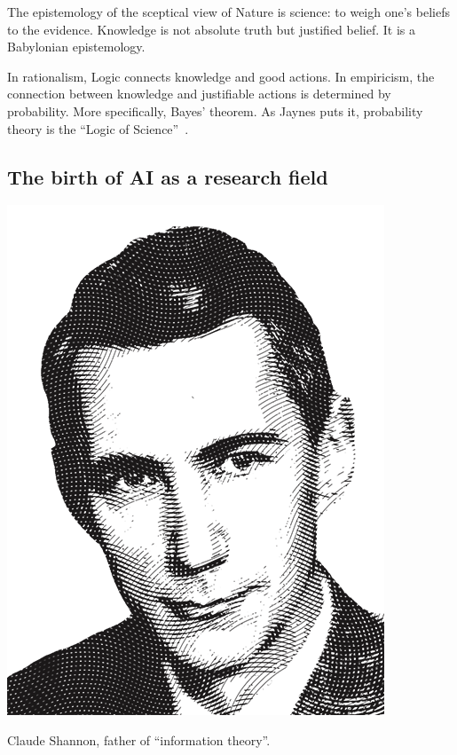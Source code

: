 \documentclass[
  letterpaper,
  DIV=11,
  numbers=noendperiod,
  oneside]{scrreprt}
\begin{document}
The epistemology of the sceptical view of Nature is science: to weigh
one's beliefs to the evidence. Knowledge is not absolute truth but
justified belief. It is a Babylonian epistemology.

In rationalism, Logic connects knowledge and good actions. In
empiricism, the connection between knowledge and justifiable actions is
determined by probability. More specifically, Bayes' theorem. As Jaynes
puts it, probability theory is the ``Logic of Science''~. 

\hypertarget{the-birth-of-ai-as-a-research-field}{%
\subsection{The birth of AI as a research
field}\label{the-birth-of-ai-as-a-research-field}}

\begin{marginfigure}

{\centering \includegraphics{imgs/shannon.png}

}

\caption{\label{fig-shannon}Claude Shannon, father of ``information
theory''.}

\end{marginfigure}
\end{document}
